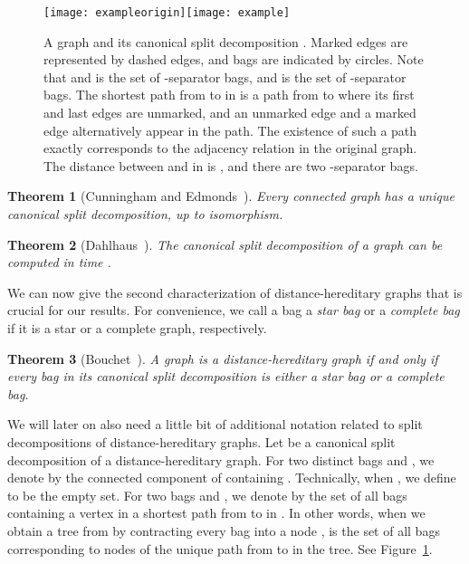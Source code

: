 \documentclass[11pt]{elsarticle}
\newtheorem{theorem}{Theorem}[section]
\begin{document}
\begin{figure}[t]
\centerline{\texttt{[image: exampleorigin]}\qquad \texttt{[image: example]}}
\caption{A graph  and its canonical split decomposition . Marked edges are represented by dashed edges, and bags are indicated by circles. 
Note that  and  is the set of -separator bags, and  is the set of -separator bags. 
The shortest path from  to  in  is a path from  to  where its first and last edges are unmarked, and
an unmarked edge and a marked edge alternatively appear in the path. The existence of such a path exactly corresponds to the adjacency relation in the original graph.
The distance between  and  in  is , and there are two -separator bags.}
\label{fig:example}
\end{figure}


\begin{theorem}[Cunningham and Edmonds~\cite{CunninghamE80}] \label{thm:CED} 
Every connected graph has a unique canonical split decomposition, up to isomorphism.
\end{theorem}
\begin{theorem}[Dahlhaus~\cite{Dahlhaus00}]\label{thm:dahlhaus}
The canonical split decomposition of a graph   can be computed in time .
\end{theorem}


We can now give the second characterization of distance-hereditary graphs that is crucial for our results.
For convenience, we call a bag a \emph{star bag} or a \emph{complete bag} if it is a star or a complete graph, respectively.

\begin{theorem}[Bouchet~\cite{Bouchet1988a}]\label{thm:bouchet}
A graph is a distance-hereditary graph if and only if every bag in its canonical split decomposition is either a star bag or a complete bag.
\end{theorem}

We will later on also need a little bit of additional notation related to split decompositions of distance-hereditary graphs.
Let  be a canonical split decomposition of a distance-hereditary graph.
For two distinct bags  and , we denote by  the connected component of  containing .
Technically, when , we define  to be the empty set.
For two bags  and , we denote by  the set of all bags containing a vertex in a shortest path from  to  in .
In other words, when we obtain a tree from  by contracting every bag  into a node ,
 is the set of all bags corresponding to nodes of the unique path from  to  in the tree. 
See Figure~\ref{fig:example}.
\end{document}
